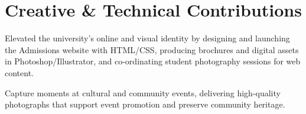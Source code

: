 \section{Creative \& Technical Contributions}
\begin{sectionContainer}
	\noindent\normalsize Elevated the university's online and visual identity by designing and launching the Admissions website with HTML/CSS, producing brochures and digital assets in Photoshop/Illustrator, and co-ordinating student photography sessions for web content.
\end{sectionContainer}

\begin{sectionContainer}
	\noindent\normalsize Capture moments at cultural and community events, delivering high-quality photographs that support event promotion and preserve community heritage.
\end{sectionContainer}

\nopagebreak[4]
